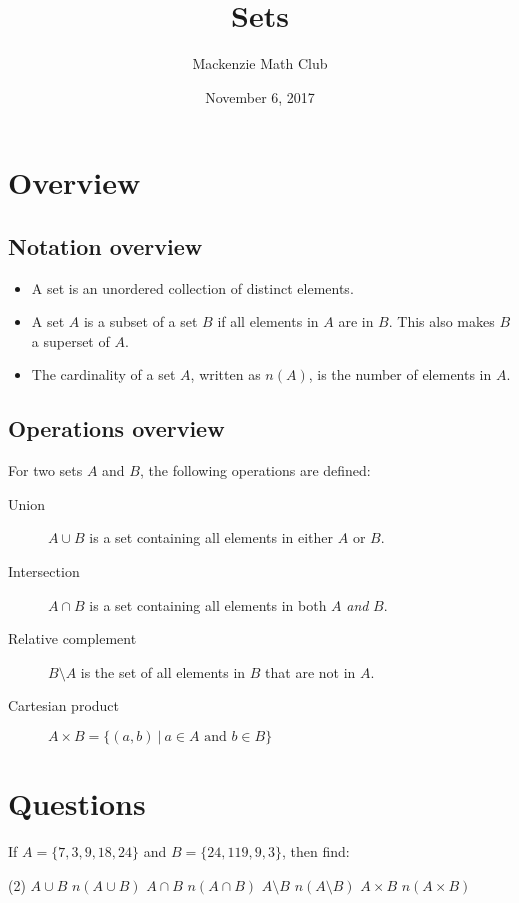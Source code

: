 \documentclass[letterpaper,12pt]{article}
\title{Sets}
\author{Mackenzie Math Club}
\date{November 6, 2017}
\newcommand{\such}{\ |\ }
\begin{document}
	\maketitle
	\thispagestyle{fancy}
	\section{Overview}
		\subsection{Notation overview}
			\begin{itemize}
				\item A set is an unordered collection of distinct elements.
				\item A set $A$ is a subset of a set $B$ if all elements in $A$ are in $B$. This also makes $B$ a superset of $A$.
				\item The cardinality of a set $A$, written as $n(A)$, is the number of elements in $A$.
			\end{itemize}
		\subsection{Operations overview}
			For two sets $A$ and $B$, the following operations are defined:
			\begin{description}
				\item[Union] $A \cup B$ is a set containing all elements in either $A$ or $B$.
				\item[Intersection] $A \cap B$ is a set containing all elements in both $A$ \emph{and} $B$.
				\item[Relative complement] $B \setminus A$ is the set of all elements in $B$ that are not in $A$.
				\item[Cartesian product] $A \times B = \{(a,b) \such a \in A \text{ and } b \in B\}$
			\end{description}
	\section{Questions}
		If $A = \{7,3,9,18,24\}$ and $B = \{24,119,9,3\}$, then find:
		\begin{tasks}[style=enumerate](2)
			\task $A \cup B$
			\task $n(A \cup B)$
			\task $A \cap B$
			\task $n(A \cap B)$
			\task $A \setminus B$
			\task $n(A \setminus B)$
			\task $A \times B$
			\task $n(A \times B)$
		\end{tasks}
\end{document}
